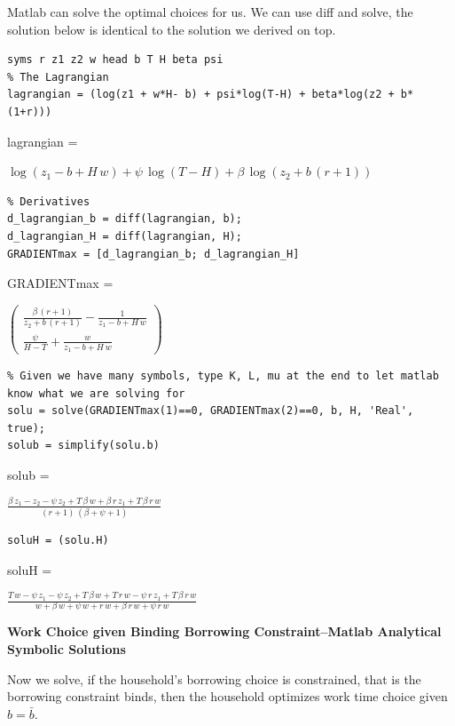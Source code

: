 \documentclass[
]{book}
\begin{document}
Matlab can solve the optimal choices for us. We can use diff and solve,
the solution below is identical to the solution we derived on top.

\begin{verbatim}
syms r z1 z2 w head b T H beta psi
% The Lagrangian
lagrangian = (log(z1 + w*H- b) + psi*log(T-H) + beta*log(z2 + b*(1+r)))
\end{verbatim}

lagrangian =

\(\displaystyle \log \left(z_1 -b+H\,w\right)+\psi \,\log \left(T-H\right)+\beta \,\log \left(z_2 +b\,{\left(r+1\right)}\right)\)

\begin{verbatim}
% Derivatives
d_lagrangian_b = diff(lagrangian, b);
d_lagrangian_H = diff(lagrangian, H);
GRADIENTmax = [d_lagrangian_b; d_lagrangian_H]
\end{verbatim}

GRADIENTmax =

\(\displaystyle \left(\begin{array}{c} \frac{\beta \,{\left(r+1\right)}}{z_2 +b\,{\left(r+1\right)}}-\frac{1}{z_1 -b+H\,w}\\ \frac{\psi }{H-T}+\frac{w}{z_1 -b+H\,w} \end{array}\right)\)

\begin{verbatim}
% Given we have many symbols, type K, L, mu at the end to let matlab know what we are solving for
solu = solve(GRADIENTmax(1)==0, GRADIENTmax(2)==0, b, H, 'Real', true);
solub = simplify(solu.b)
\end{verbatim}

solub =

\(\displaystyle \frac{\beta \,z_1 -z_2 -\psi \,z_2 +T\,\beta \,w+\beta \,r\,z_1 +T\,\beta \,r\,w}{{\left(r+1\right)}\,{\left(\beta +\psi +1\right)}}\)

\begin{verbatim}
soluH = (solu.H)
\end{verbatim}

soluH =

\(\displaystyle \frac{T\,w-\psi \,z_1 -\psi \,z_2 +T\,\beta \,w+T\,r\,w-\psi \,r\,z_1 +T\,\beta \,r\,w}{w+\beta \,w+\psi \,w+r\,w+\beta \,r\,w+\psi \,r\,w}\)

\textbf{Work Choice given Binding Borrowing Constraint--Matlab Analytical
Symbolic Solutions}

Now we solve, if the household's borrowing choice is constrained, that
is the borrowing constraint binds, then the household optimizes work
time choice given \(b=\bar{b}\).
\end{document}
